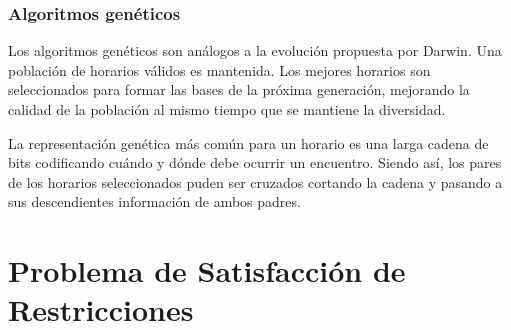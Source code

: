 \subsubsection{Algoritmos genéticos}

Los algoritmos genéticos son análogos a la evolución propuesta por Darwin. Una población de horarios válidos
es mantenida. Los mejores horarios son seleccionados para formar las bases de la próxima generación, mejorando
la calidad de la población al mismo tiempo que se mantiene la diversidad.

La representación genética más común para un horario es una larga cadena de bits codificando cuándo y dónde
debe ocurrir un encuentro. Siendo así, los pares de los horarios seleccionados puden ser cruzados cortando
la cadena y pasando a sus descendientes información de ambos padres.



\section{Problema de Satisfacción de Restricciones}
